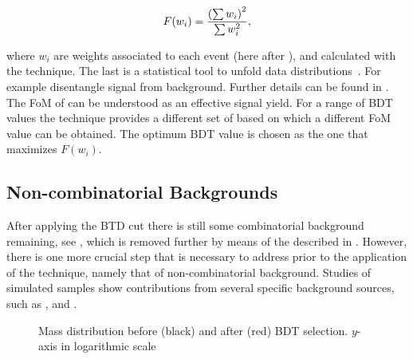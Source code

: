 \begin{equation}
  \centering
  F(w_i) = \frac{\left(\sum{w_{i}}\right)^2}{\sum{w_{i}^2}},
\label{eqn:fom}
\end{equation}

\noindent where $w_i$ are weights associated to each event (here after \sWeights), and calculated with the \sPlot
technique. The last  is a statistical tool to unfold data distributions~\cite{splot}. For example disentangle signal from background.
Further details can be found in . The FoM of  can be understood as an effective signal yield.
For a range of BDT values the \sPlot technique provides a different set of \sWeights based on which a different FoM value can be obtained.
The optimum BDT value is chosen as the one that maximizes $F(w_i)$.

\subsection{Non-combinatorial Backgrounds}
\label{peaking_backgrounds}

After applying the BTD cut there is still some combinatorial background remaining, see , which is removed
further by means of the \sWeights described in . However, there is
one more crucial step that is necessary to address prior to the application of the \sPlot technique,
namely that of non-combinatorial background.
Studies of simulated samples show contributions from several specific background sources, such as \BsJpsiKK, \BsJpsipipi and \BdJpsipipi.

\begin{figure}[!h]
  \begin{center}
  \scalebox{1}{}
  \caption{Mass distribution before (black) and after (red) BDT selection. $y$-axis in logarithmic scale}
  \label{mass_BDTG_selection}
  \end{center}
\end{figure}

